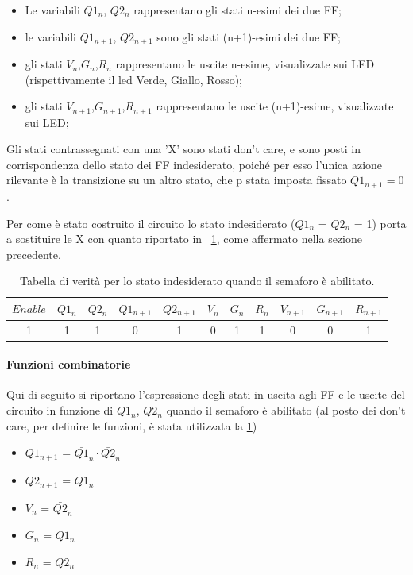 \documentclass[a4paper,10pt]{article}
\begin{document}
\begin{itemize}
	\item Le variabili $Q1_n$, $Q2_n$ rappresentano gli stati n-esimi dei due FF;
	\item le variabili $Q1_{n+1}$, $Q2_{n+1}$ sono gli stati (n+1)-esimi dei due FF;
	\item gli stati $V_n$,$G_n$,$R_n$ rappresentano le uscite n-esime, visualizzate sui LED (rispettivamente il led Verde, Giallo, Rosso);
	\item gli stati $V_{n+1}$,$G_{n+1}$,$R_{n+1}$ rappresentano le uscite (n+1)-esime, visualizzate sui LED;
\end{itemize}
Gli stati contrassegnati con una 'X' sono stati don't care, e sono posti in corrispondenza dello stato dei FF indesiderato, poiché per esso l'unica azione rilevante è la transizione su un altro stato, che p stata imposta fissato $ Q1_{n+1} = 0 $.

Per come è stato costruito il circuito lo stato indesiderato ($Q1_n$ = $Q2_n$ = 1) porta a sostituire le X con quanto riportato in \tablename{~\ref{tab:inde}}, come affermato nella sezione precedente.

\begin{table}[H]
	\centering
	\begin{tabular}{c|cc|cc|ccc|ccc}
		\hline
		$Enable$ & $Q1_n$ &	$Q2_n$ & $Q1_{n+1}$ & $Q2_{n+1}$ & $V_n$ & $G_n$ & $R_n$ & $V_{n+1}$ & $G_{n+1}$ & $R_{n+1}$ \\
		\hline
		1 & 1 & 1 & 0 & 1 & 0 &  1 & 1 & 0 & 0 & 1  \\
		\hline
	\end{tabular}
	\caption{Tabella di verità per lo stato indesiderato quando il semaforo è abilitato.}
	\label{tab:inde}
\end{table}
%

\paragraph{Funzioni combinatorie}
Qui di seguito si riportano l'espressione degli stati in uscita agli FF e le uscite del circuito in funzione di $Q1_n$, $Q2_n$ quando il semaforo è abilitato (al posto dei don't care, per definire le funzioni, è stata utilizzata la \cref{tab:inde})
\begin{itemize}
\item $Q1_{n+1}$ = $\bar{Q1}_n \cdot \bar{Q2}_n $
\item $Q2_{n+1}$ = $Q1_n$ 
\item $V_{n}$ = $\bar{Q2}_n$
\item $G_{n}$ = $Q1_n$ 
\item $R_{n}$ = $Q2_n$ 
\end{itemize}
\end{document}
